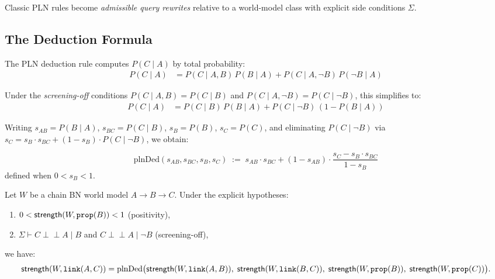 \documentclass[11pt,openany]{report}
\begin{document}
Classic PLN rules become \emph{admissible query rewrites} relative to a
world-model class with explicit side conditions $\Sigma$.

\subsection{The Deduction Formula}

The PLN deduction rule computes $P(C \mid A)$ by total probability:
\begin{align}
  P(C \mid A) &= P(C \mid A, B)\,P(B \mid A) + P(C \mid A, \lnot B)\,P(\lnot B \mid A)
  \label{eq:total-prob}
\end{align}

Under the \emph{screening-off} conditions
$P(C \mid A, B) = P(C \mid B)$ and
$P(C \mid A, \lnot B) = P(C \mid \lnot B)$, this simplifies to:
\begin{align}
  P(C \mid A) &= P(C \mid B)\,P(B \mid A)
    + P(C \mid \lnot B)\,(1 - P(B \mid A))
  \label{eq:deduction-screened}
\end{align}

Writing $s_{AB} = P(B \mid A)$, $s_{BC} = P(C \mid B)$, $s_B = P(B)$,
$s_C = P(C)$, and eliminating $P(C \mid \lnot B)$ via
$s_C = s_B \cdot s_{BC} + (1 - s_B) \cdot P(C \mid \lnot B)$, we obtain:

\begin{definition}
\label{def:deduction-strength}
\[
  \mathrm{plnDed}(s_{AB}, s_{BC}, s_B, s_C) \;:=\;
  s_{AB} \cdot s_{BC} + (1 - s_{AB}) \cdot \frac{s_C - s_B \cdot s_{BC}}{1 - s_B}
\]
defined when $0 < s_B < 1$.
\end{definition}

\begin{theorem}
\label{thm:chain-deduction}
Let $W$ be a chain BN world model $A \to B \to C$.  Under the explicit
hypotheses:
\begin{enumerate}
\item[(i)] $0 < \mathsf{strength}(W, \texttt{prop}(B)) < 1$ \quad (positivity),
\item[(ii)] $\Sigma \vdash C \perp\!\!\!\perp A \mid B$ and
  $C \perp\!\!\!\perp A \mid \lnot B$ \quad (screening-off),
\end{enumerate}
we have:
\[
  \mathsf{strength}(W, \texttt{link}(A, C)) = \mathrm{plnDed}\big(
    \mathsf{strength}(W, \texttt{link}(A, B)),\;
    \mathsf{strength}(W, \texttt{link}(B, C)),\;
    \mathsf{strength}(W, \texttt{prop}(B)),\;
    \mathsf{strength}(W, \texttt{prop}(C))
  \big).
\]
\end{theorem}
\end{document}
